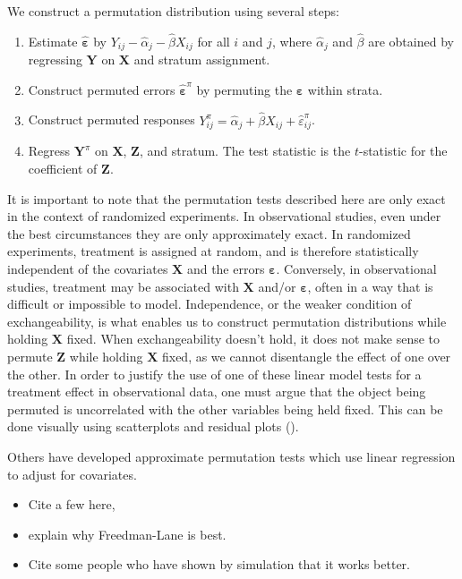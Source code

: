 \documentclass[11pt]{article}
\newcommand{\bit}{\begin{itemize}}
\newcommand{\eit}{\end{itemize}}
\newcommand{\todo}[1]{{\color{red}{TO DO: \sc #1}}}
\begin{document}
We construct a permutation distribution using several steps:

\begin{enumerate}
\item Estimate $\mathbf{\hat{\varepsilon}}$ by $Y_{ij} - \hat{\alpha}_j - \hat{\beta} X_{ij}$ for all $i$ and $j$, where $\hat{\alpha}_j$ and $\hat{\beta}$ are obtained by regressing $\mathbf{Y}$ on $\mathbf{X}$ and stratum assignment.
\item Construct permuted errors $\mathbf{\hat{\varepsilon}}^\pi$ by permuting the $\mathbf{\hat{\varepsilon}}$ within strata.
\item Construct permuted responses $Y_{ij}^\pi = \hat{\alpha}_j + \hat{\beta} X_{ij}+ \hat{\varepsilon}_{ij}^\pi$.
\item Regress $\mathbf{Y}^\pi$ on $\mathbf{X}$, $\mathbf{Z}$, and stratum. The test statistic is the $t$-statistic for the coefficient of $\mathbf{Z}$.
\end{enumerate}


It is important to note that the permutation tests described here are only exact in the context of randomized experiments.
In observational studies, even under the best circumstances they are only approximately exact.
In randomized experiments, treatment is assigned at random, and is therefore statistically independent of the covariates $\mathbf{X}$ and the errors $\mathbf{\varepsilon}$.
Conversely, in observational studies, treatment may be associated with $\mathbf{X}$ and/or $\mathbf{\varepsilon}$, often in a way that is difficult or impossible to model.
Independence, or the weaker condition of exchangeability, is what enables us to construct permutation distributions while holding $\mathbf{X}$ fixed.
When exchangeability doesn't hold, it does not make sense to permute $\mathbf{Z}$ while holding $\mathbf{X}$ fixed, as we cannot disentangle the effect of one over the other.
In order to justify the use of one of these linear model tests for a treatment effect in observational data, one must argue that the object being permuted is uncorrelated with the other variables being held fixed.
This can be done visually using scatterplots and residual plots (\cite{freedman_nonstochastic_1983}).

Others have developed approximate permutation tests which use linear regression to adjust for covariates. 
\bit
\item Cite a few here, \todo{all the Anderson papers}
\item explain why Freedman-Lane is best. 
\item Cite some people who have shown by simulation that it works better.
\eit
\end{document}
